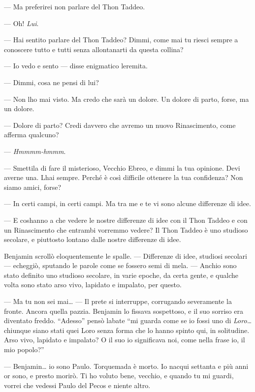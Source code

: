 --- Ma preferirei non parlare del Thon Taddeo.

--- Oh! \emph{Lui}.

--- Hai sentito parlare del Thon Taddeo? Dimmi, come mai tu riesci
sempre a conoscere tutto e tutti senza allontanarti da questa collina?

--- Io vedo e sento --- disse enigmatico l\textquotesingle eremita.

--- Dimmi, cosa ne pensi di lui?

--- Non l\textquotesingle ho mai visto. Ma credo che sarà un dolore. Un
dolore di parto, forse, ma un dolore.

--- Dolore di parto? Credi davvero che avremo un nuovo Rinascimento,
come afferma qualcuno?

--- \emph{Hmmmm-hmmm}.

--- Smettila di fare il misterioso, Vecchio Ebreo, e dimmi la tua
opinione. Devi averne una. L\textquotesingle hai sempre. Perché è così
difficile ottenere la tua confidenza? Non siamo amici, forse?

--- In certi campi, in certi campi. Ma tra me e te vi sono alcune
differenze di idee.

--- E cos\textquotesingle hanno a che vedere le nostre differenze di
idee con il Thon Taddeo e con un Rinascimento che entrambi vorremmo
vedere? Il Thon Taddeo è uno studioso secolare, e piuttosto lontano
dalle nostre differenze di idee.

Benjamin scrollò eloquentemente le spalle. --- Differenze di idee,
studiosi secolari --- echeggiò, sputando le parole come se fossero semi
di mela. --- Anch\textquotesingle io sono stato definito uno studioso
secolare, in varie epoche, da certa gente, e qualche volta sono stato
arso vivo, lapidato e impalato, per questo.

--- Ma tu non sei mai\ldots{} --- Il prete si interruppe, corrugando
severamente la fronte. Ancora quella pazzia. Benjamin lo fissava
sospettoso, e il suo sorriso era diventato freddo. ``Adesso'' pensò
l\textquotesingle abate ``mi guarda come se io fossi uno di
\emph{Loro\ldots{}} chiunque siano stati quei
\textquotesingle Loro\textquotesingle{} senza forma che lo hanno spinto
qui, in solitudine. Arso vivo, lapidato e impalato? O il suo
\textquotesingle io\textquotesingle{} significava
\textquotesingle noi\textquotesingle, come nella frase
\textquotesingle io, il mio popolo\textquotesingle?''

--- Benjamin\ldots{} io sono Paulo. Torquemada è morto. Io nacqui
settanta e più anni or sono, e presto morirò. Ti ho voluto bene,
vecchio, e quando tu mi guardi, vorrei che vedessi Paulo del Pecos e
niente altro.

